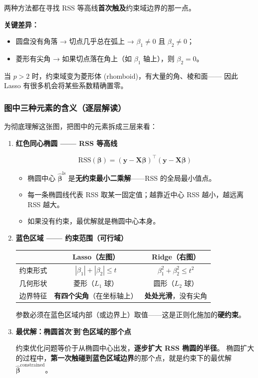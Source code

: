 两种方法都在寻找 RSS 等高线\textbf{首次触及}约束域边界的那一点。

\textbf{关键差异：}
\begin{itemize}
    \item 圆盘没有角落 → 切点几乎总在弧上 → $\beta_1 \neq 0$ 且 $\beta_2 \neq 0$；
    \item 菱形有尖角 → 如果切点落在角上（如 $\beta_1$ 轴上），则 $\beta_2 = 0$。
\end{itemize}

当 $p > 2$ 时，约束域变为菱形体 (rhomboid)，有大量的角、棱和面——
因此 Lasso 有很多机会将某些系数精确置零。

\subsubsection{图中三种元素的含义（逐层解读）}

为彻底理解这张图，把图中的元素拆成三层来看：

\begin{enumerate}[leftmargin=*]

\item \textbf{红色同心椭圆 —— RSS 等高线}

\[\text{RSS}(\bm{\beta}) = (\mathbf{y} - \mathbf{X}\bm{\beta})^\top(\mathbf{y} - \mathbf{X}\bm{\beta})\]

\begin{itemize}
    \item 椭圆中心 $\hat{\bm{\beta}}^{\text{ls}}$ 是\textbf{无约束最小二乘解}——RSS 的全局最小值点。
    \item 每一条椭圆线代表 RSS 取某一固定值；越靠近中心 RSS 越小，越远离 RSS 越大。
    \item 如果没有约束，最优解就是椭圆中心本身。
\end{itemize}

\item \textbf{蓝色区域 —— 约束范围（可行域）}

\begin{center}
\begin{tabular}{c|c|c}
\toprule
& \textbf{Lasso（左图）} & \textbf{Ridge（右图）} \\
\midrule
约束形式 & $|\beta_1| + |\beta_2| \le t$ & $\beta_1^2 + \beta_2^2 \le t^2$ \\
几何形状 & 菱形（$L_1$ 球） & 圆形（$L_2$ 球） \\
边界特征 & \textbf{有四个尖角}（在坐标轴上） & \textbf{处处光滑}，没有尖角 \\
\bottomrule
\end{tabular}
\end{center}

参数必须在蓝色区域内部（或边界上）取值——这是正则化施加的\textbf{硬约束}。

\item \textbf{最优解：椭圆首次\"碰到\"蓝色区域的那个点}

约束优化问题等价于从椭圆中心出发，\textbf{逐步扩大 RSS 椭圆的半径}。
椭圆扩大的过程中，\textbf{第一次触碰到蓝色区域边界}的那个点，就是约束下的最优解 $\hat{\bm{\beta}}^{\text{constrained}}$。

\end{enumerate}

